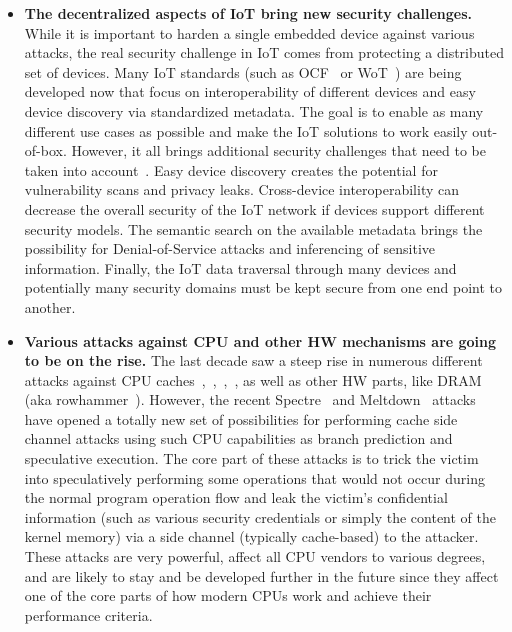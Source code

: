 \begin{itemize}
	\item \textbf{The decentralized aspects of IoT bring new security challenges.} While it is important to harden a single embedded device against various attacks, the real security challenge in IoT comes from protecting a distributed set of devices. Many IoT standards (such as OCF~\cite{ocf} or WoT~\cite{wot}) are being developed now that focus on interoperability of different devices and easy device discovery via standardized metadata. The goal is to enable as many different use cases as possible and make the IoT solutions to work easily out-of-box. However, it all brings additional security challenges that need to be taken into account~\cite{McCool2018}. Easy device discovery creates the potential for vulnerability scans and privacy leaks. Cross-device interoperability can decrease the overall security of the IoT network if devices support different security models. The semantic search on the available metadata brings the possibility for Denial-of-Service attacks and inferencing of sensitive information. Finally, the IoT data traversal through many devices and potentially many security domains must be kept secure from one end point to another.
	
	\item \textbf{Various attacks against CPU and other HW mechanisms are going to be on the rise.} The last decade saw a steep rise in numerous different attacks against CPU caches~\cite{lipp2016armageddon},~\cite{brasser2017software},~\cite{gras2017aslr},~\cite{irazoqui2017cache}, as well as other HW parts, like DRAM (aka rowhammer~\cite{seaborn2015exploiting}). However, the recent Spectre~\cite{Kocher2018spectre} and Meltdown~\cite{Lipp2018meltdown} attacks have opened a totally new set of possibilities for performing cache side channel attacks using such CPU capabilities as branch prediction and speculative execution. The core part of these attacks is to trick the victim into speculatively performing some operations that would not occur during the normal program operation flow and leak the victim's confidential information (such as various security credentials or simply the content of the kernel memory) via a side channel (typically cache-based) to the attacker. These attacks are very powerful, affect all CPU vendors to various degrees, and are likely to stay and be developed further in the future since they affect one of the core parts of how modern CPUs work and achieve their performance criteria. 		
	

\end{itemize}

